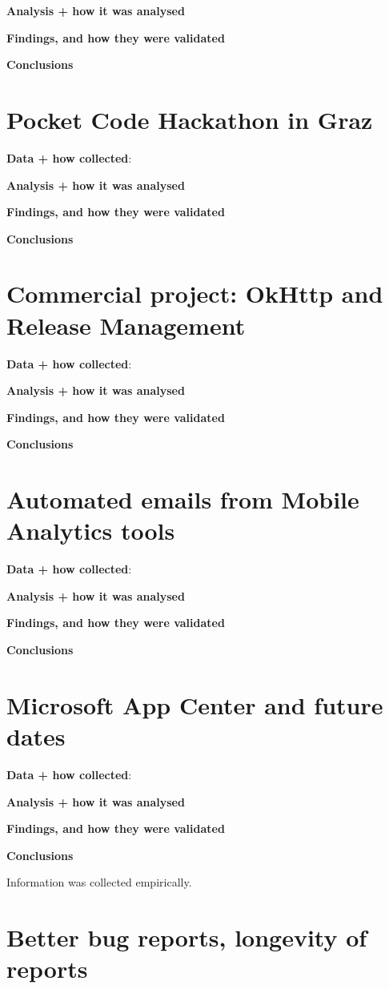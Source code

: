 \textbf{Analysis + how it was analysed}

\textbf{Findings, and how they were validated}

\textbf{Conclusions}


\section{Pocket Code Hackathon in Graz}

\textbf{Data + how collected}: 

\textbf{Analysis + how it was analysed}

\textbf{Findings, and how they were validated}

\textbf{Conclusions}


\section{Commercial project: OkHttp and Release Management}

\textbf{Data + how collected}: 

\textbf{Analysis + how it was analysed}

\textbf{Findings, and how they were validated}

\textbf{Conclusions}


\section{Automated emails from Mobile Analytics tools}

\textbf{Data + how collected}: 

\textbf{Analysis + how it was analysed}

\textbf{Findings, and how they were validated}

\textbf{Conclusions}


\section{Microsoft App Center and future dates}

\textbf{Data + how collected}: 

\textbf{Analysis + how it was analysed}

\textbf{Findings, and how they were validated}

\textbf{Conclusions}

Information was collected empirically.


\section{Better bug reports, longevity of reports}

